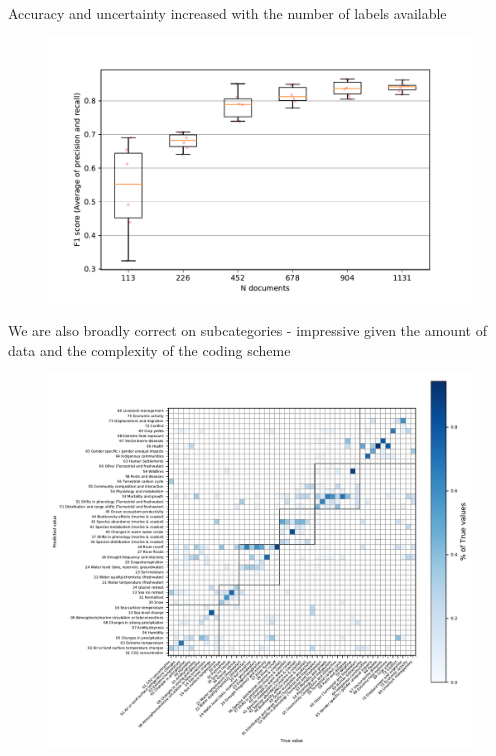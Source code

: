 \documentclass[9pt]{beamer}
\begin{document}
\begin{frame}{Accuracy and uncertainty increased with the number of labels available}

\begin{figure}
	\includegraphics[width=0.8\linewidth]{../plots/progress/cats_prediction_n.pdf}

\end{figure}

\end{frame}

\begin{frame}{We are also broadly correct on subcategories - impressive given the amount of data and the complexity of the coding scheme}
	\begin{figure}
		
		\includegraphics[width=0.8\linewidth]{../plots/prediction_models/confusion_all_classes_pred.pdf}
	\end{figure}
\end{frame}
\end{document}
